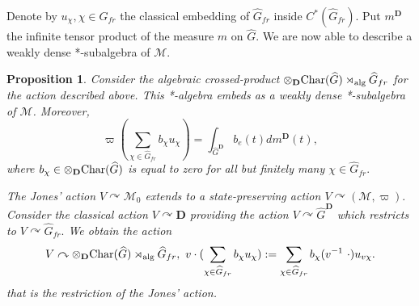 \documentclass[a4paper,12pt]{amsart}
\numberwithin{equation}{section}
\newtheorem{proposition}[theo]{Proposition}
\theoremstyle{definition}
\newcommand{\act}{\curvearrowright}
\DeclareMathOperator{\alg}{alg}
\newcommand{\Ch}{\textup{Char}}
\newcommand{\D}{\mathbf D}
\newcommand{\scrM}{\mathscr M}
\newcommand{\ot}{\otimes}\newcommand{\otmin}{\otimes_{\text{min}}}
\newcommand{\wh}{\widehat}
\begin{document}
Denote by $u_\chi, \chi\in \wh G_{fr}$ the classical embedding of $\wh G_{fr}$ inside $C^*(\wh G_{fr})$.
Put $m^\D$ the infinite tensor product of the measure $m$ on $\wh G.$
We are now able to describe a weakly dense *-subalgebra of $\scrM$.

\begin{proposition}\label{prop:AlgCP}
Consider the algebraic crossed-product $\ot_\D \Ch(\wh G)\rtimes_{\alg} \wh G_{fr}$ for the action described above.
This *-algebra embeds as a weakly dense *-subalgebra of $\scrM$.
Moreover, $$\varpi(\sum_{\chi\in \wh G_{fr}} b_\chi u_\chi ) = \int_{{\wh G}^\D} b_e (t) d m^\D(t),$$
where $b_\chi\in \ot_\D \Ch(\wh G)$ is equal to zero for all but finitely many $\chi\in\wh G_{fr}.$

The Jones' action $V\act \scrM_0$ extends to a state-preserving action $V\act (\scrM,\varpi).$
Consider the classical action $V\act \D$ providing the action $V\act {\wh G}^\D$ which restricts to $V\act \wh G_{fr}.$
We obtain the action 
$$V\act \ot_\D \Ch(\wh G)\rtimes_{\alg} \wh G_{fr},\  v\cdot (\sum_{\chi\in \wh G_{fr}} b_\chi u_\chi ) := \sum_{\chi\in \wh G_{fr}} b_{\chi}(v^{-1} \ \cdot ) u_{v\chi}.$$
that is the restriction of the Jones' action.
\end{proposition}
\end{document}
